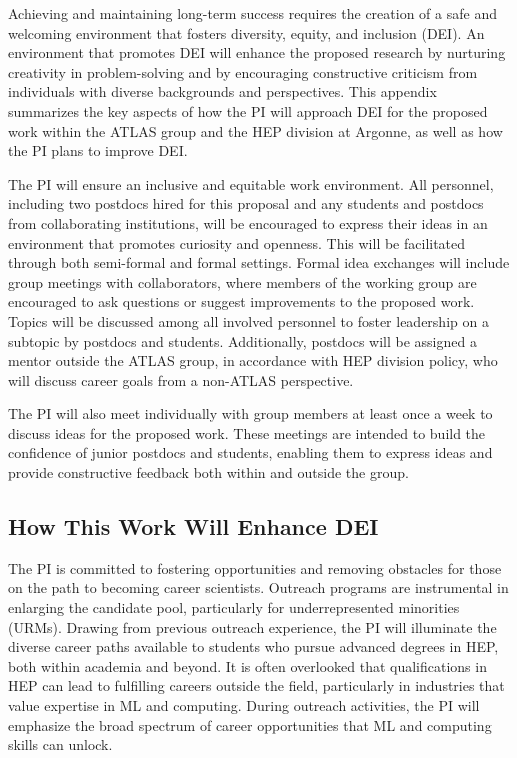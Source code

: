 \documentclass[letter, USenglish, 11pt, subfigure]{article}
\begin{document}
Achieving and maintaining long-term success requires the creation of a safe and welcoming environment that fosters diversity, equity, and inclusion (DEI). An environment that promotes DEI will enhance the proposed research by nurturing creativity in problem-solving and by encouraging constructive criticism from individuals with diverse backgrounds and perspectives. This appendix summarizes the key aspects of how the PI will approach DEI for the proposed work within the ATLAS group and the HEP division at Argonne, as well as how the PI plans to improve DEI.

The PI will ensure an inclusive and equitable work environment. All personnel, including two postdocs hired for this proposal and any students and postdocs from collaborating institutions, will be encouraged to express their ideas in an environment that promotes curiosity and openness. This will be facilitated through both semi-formal and formal settings. Formal idea exchanges will include group meetings with collaborators, where members of the working group are encouraged to ask questions or suggest improvements to the proposed work. Topics will be discussed among all involved personnel to foster leadership on a subtopic by postdocs and students. Additionally, postdocs will be assigned a mentor outside the ATLAS group, in accordance with HEP division policy, who will discuss career goals from a non-ATLAS perspective.

The PI will also meet individually with group members at least once a week to discuss ideas for the proposed work. These meetings are intended to build the confidence of junior postdocs and students, enabling them to express ideas and provide constructive feedback both within and outside the group.

\subsection{How This Work Will Enhance DEI}

The PI is committed to fostering opportunities and removing obstacles for those on the path to becoming career scientists. Outreach programs are instrumental in enlarging the candidate pool, particularly for underrepresented minorities (URMs). Drawing from previous outreach experience, the PI will illuminate the diverse career paths available to students who pursue advanced degrees in HEP, both within academia and beyond. It is often overlooked that qualifications in HEP can lead to fulfilling careers outside the field, particularly in industries that value expertise in ML and computing. During outreach activities, the PI will emphasize the broad spectrum of career opportunities that ML and computing skills can unlock.
\end{document}

